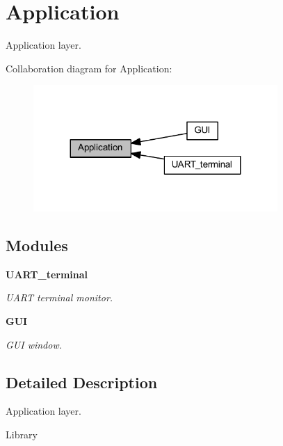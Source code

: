\section{Application}
\label{group___application}


Application layer.  


Collaboration diagram for Application\+:\nopagebreak
\begin{figure}[H]
\begin{center}
\leavevmode
\includegraphics[width=263pt]{group___application}
\end{center}
\end{figure}
\subsection*{Modules}
\begin{DoxyCompactItemize}
\item 
\textbf{ U\+A\+R\+T\+\_\+terminal}
\begin{DoxyCompactList}\small\item\em U\+A\+RT terminal monitor. \end{DoxyCompactList}\item 
\textbf{ G\+UI}
\begin{DoxyCompactList}\small\item\em G\+UI window. \end{DoxyCompactList}\end{DoxyCompactItemize}


\subsection{Detailed Description}
Application layer. 

Library 